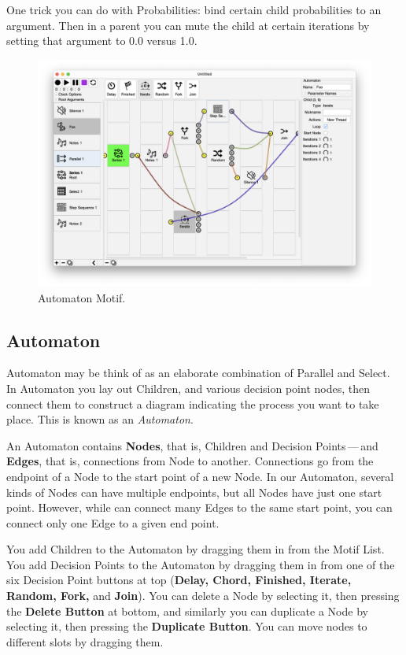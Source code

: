 \documentclass[twoside,10pt]{article}
\begin{document}
One trick you can do with Probabilities: bind certain child probabilities to an argument.  Then in a parent you can mute the child at certain iterations by setting that argument to 0.0 versus 1.0.



\clearpage

\begin{figure}[t]
\centering
\includegraphics[width=6.5in]{Automaton}
\vspace{-2em}
\caption{Automaton Motif.}
\label{automaton}
\end{figure}

\subsection{Automaton}

Automaton may be think of as an elaborate combination of Parallel and Select.  In Automaton you lay out Children, and various decision point nodes, then connect them to construct a diagram indicating the process you want to take place.  This is known as an {\it Automaton}.  

An Automaton contains {\bf Nodes}, that is, Children and Decision Points\,---\,and {\bf Edges}, that is, connections from Node to another.  Connections go from the endpoint of a Node to the start point of a new Node.  In our Automaton, several kinds of Nodes can have multiple endpoints, but all Nodes have just one start point.  However, while can connect many Edges to the same start point, you can connect only one Edge to a given end point.

You add Children to the Automaton by dragging them in from the Motif List.  You add Decision Points to the Automaton by dragging them in from one of the six Decision Point buttons at top ({\bf Delay, Chord, Finished, Iterate, Random, Fork,} and {\bf Join}).  You can delete a Node by selecting it, then pressing the {\bf Delete Button} at bottom, and similarly you can duplicate a Node by selecting it, then pressing the {\bf Duplicate Button}.  You can move nodes to different slots by dragging them. 
\end{document}
